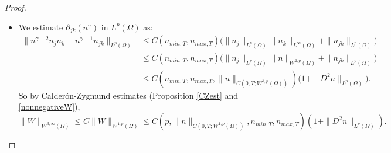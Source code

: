 \documentclass[12pt]{article}
\theoremstyle{plain}
\begin{document}
\begin{proof}
\begin{itemize}
    \begin{align*}
    \Big|p\sum_{i = 1}^{d} &\int_{0}^{t} \int_{\Omega} nn_{jk}^{p - 1}W_{iijk}\Big| \\ &\le C_{p}\left(\left|\int_{0}^{t} \int_{\Omega} nn_{jk}^{p - 1}W_{jk}\right| + \left|\int_{0}^{t} \int_{\Omega} n^{\gamma - 1} n_{j}n_{k} n_{jk}^{p - 1}\right| + \left|\int_{0}^{t} \int_{\Omega} n^{\gamma}n_{jk}^{p}\right|\right) \\
    &\le C_{p}\left(\int_{0}^{t} \int_{\Omega} \Big(n^{p}|W_{jk}|^{p} + n^{(\gamma - 1)p} |\nabla n|^{2p}\Big) + \int_{0}^{t} \int_{\Omega} \Big(1 + n^{\gamma}\Big)|D^{2}n|^{p}\right) \\
    &\le C(p, n_{min, T}, n_{max, T})\left(\int_{0}^{t} \Big(\|W\|^{p}_{W^{2, p}(\Omega)} + \|\nabla n\|_{L^{\infty}(\Omega)}^{p} \|\nabla n\|_{L^{p}(\Omega)}^{p}\Big) + \int_{0}^{t} \int_{\Omega} |D^{2}n|^{p}\right) \\
    &\le C(p, \|n\|_{C(0, T; W^{1, p}(\Omega))}, n_{min, T}, n_{max, T}) \int_{0}^{t} \int_{\Omega}\Big(1 + |D^{2}n|^{p}\Big),
    \end{align*}
    using $p > d$ along with the Sobolev embedding $W^{2, p}(\Omega) \subset W^{1, \infty}(\Omega)$ to estimate $\|\nabla n\|_{L^{\infty}(\Omega)}$ and the assumption that $W \in C(0, T; W^{3, p}(\Omega)) \subset C(0, T; W^{2, \infty}(\Omega))$. Note that by Calder\'{o}n-Zygmund estimates (Proposition \ref{CZest} and \ref{nonnegativeW}), $\|W\|_{C(0, T; W^{2, p}(\Omega))} \le C_{p}\|n\|_{C(0, T; L^{p}(\Omega))}$.
    \item We estimate $\partial_{jk}(n^{\gamma})$ in $L^{p}(\Omega)$ as:
    \begin{align*}
    \|n^{\gamma - 2} n_{j}n_{k} + n^{\gamma - 1} n_{jk}\|_{L^{p}(\Omega)} &\le C(n_{min, T}, n_{max, T}) \Big(\|n_{j}\|_{L^{p}(\Omega)} \|n_{k}\|_{L^{\infty}(\Omega)} + \|n_{jk}\|_{L^{p}(\Omega)}\Big) \\
    &\le C(n_{min, T}, n_{max, T}) \Big(\|n_{j}\|_{L^{p}(\Omega)} \|n\|_{W^{2, p}(\Omega)} + \|n_{jk}\|_{L^{p}(\Omega)}\Big) \\
    &\le C(n_{min, T}, n_{max, T}, \|n\|_{C(0, T; W^{1, p}(\Omega))}) \Big(1 + \|D^{2}n\|_{L^{p}(\Omega)}\Big).
    \end{align*}
    So by Calder\'{o}n-Zygmund estimates (Proposition \ref{CZest} and \ref{nonnegativeW}),
    \begin{equation*}
    \|W\|_{W^{3, \infty}(\Omega)} \le C\|W\|_{W^{4, p}(\Omega)} \le C(p, \|n\|_{C(0, T; W^{1, p}(\Omega))}, n_{min, T}, n_{max, T}) \left(1 + \|D^{2}n\|_{L^{p}(\Omega)}\right).

\end{equation*}
\end{itemize}
\end{proof}
\end{document}
